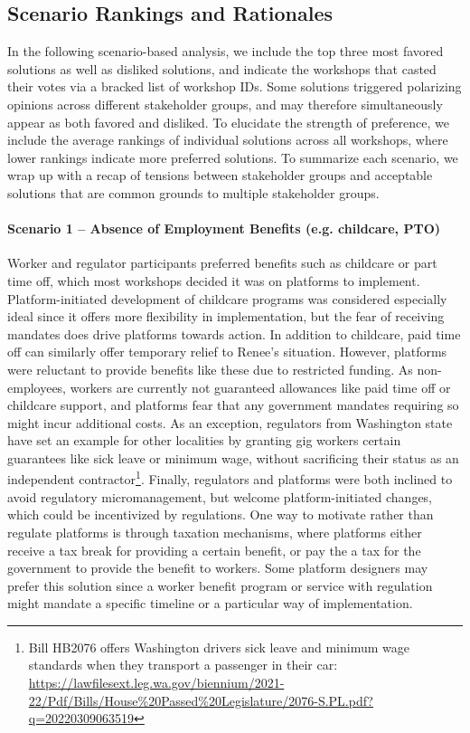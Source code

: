 \subsection{Scenario Rankings and Rationales}
In the following scenario-based analysis, we include the top three most favored solutions as well as disliked solutions, and indicate the workshops that casted their votes via a bracked list of workshop IDs. Some solutions triggered polarizing opinions across different stakeholder groups, and may therefore simultaneously appear as both favored and disliked. To elucidate the strength of preference, we include the average rankings of individual solutions across all workshops, where lower rankings indicate more preferred solutions. To summarize each scenario, we wrap up with a recap of tensions between stakeholder groups and acceptable solutions that are common grounds to multiple stakeholder groups. 

\FloatBarrier

\FloatBarrier

\paragraph{Scenario 1 -- Absence of Employment Benefits (e.g. childcare, PTO)} \label{s1}

Worker and regulator participants preferred benefits such as childcare or part time off, which most workshops decided it was on platforms to implement. 
Platform-initiated development of childcare programs was considered especially ideal since it offers more flexibility in implementation, but the fear of receiving mandates does drive platforms towards action. In addition to childcare, paid time off can similarly offer temporary relief to Renee's situation. However, platforms were reluctant to provide benefits like these due to restricted funding. As non-employees, workers are currently not guaranteed allowances like paid time off or childcare support, and platforms fear that any government mandates requiring so might incur additional costs.
As an exception, regulators from Washington state have set an example for other localities by granting gig workers certain guarantees like sick leave or minimum wage, without sacrificing their status as an independent contractor\footnote{Bill HB2076 offers Washington drivers sick leave and minimum wage standards when they transport a passenger in their car: \url{https://lawfilesext.leg.wa.gov/biennium/2021-22/Pdf/Bills/House\%20Passed\%20Legislature/2076-S.PL.pdf?q=20220309063519}}. Finally, regulators and platforms were both inclined to avoid regulatory micromanagement, but welcome platform-initiated changes, which could be incentivized by regulations. One way to motivate rather than regulate platforms is through taxation mechanisms, where platforms either receive a tax break for providing a certain benefit, or pay the a tax for the government to provide the benefit to workers. Some platform designers may prefer this solution since a worker benefit program or service with regulation might mandate a specific timeline or a particular way of implementation.

